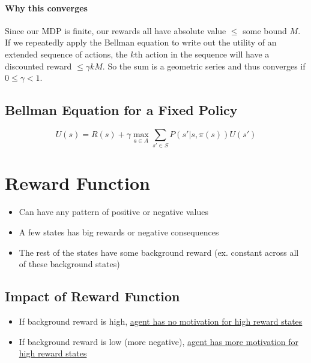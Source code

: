   \paragraph{Why this converges}

  Since our MDP is finite, our rewards all have absolute value $ \le $
  some bound $ M $. If we repeatedly apply the Bellman equation to write out
  the utility of an extended sequence of actions, the $ k $th action in
  the sequence will have a discounted reward $ \le \gamma kM $.
  So the sum is a geometric series and thus converges if $ 0 \le \gamma < 1 $.

  \subsection{Bellman Equation for a Fixed Policy}

    \begin{equation}
      U\left( s \right)
        = R\left( s \right)
        + \gamma \max_{a \in A} \sum_{s' \in S}
        P\left( s' | s, \pi\left( s \right) \right)
        U\left( s' \right)
    \end{equation}

\section{Reward Function}

  \begin{itemize}
    \item Can have any pattern of positive or negative values
    \item A few states has big rewards or negative consequences
    \item The rest of the states have some background reward (ex.
    constant across all of these background states)
  \end{itemize}

  \subsection{Impact of Reward Function}

    \begin{itemize}
      \item If background reward is high, \ul{agent has no motivation
      for high reward states}
      \item If background reward is low (more negative), \ul{agent
      has more motivation for high reward states}
    \end{itemize}

